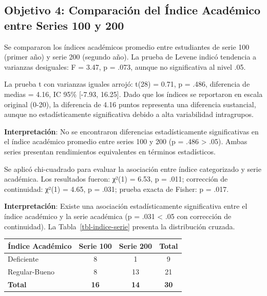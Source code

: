 \documentclass[
  stu,
  floatsintext,
  longtable,
  a4paper,
  nolmodern,
  notxfonts,
  notimes,
  12pt,
  colorlinks=true,linkcolor=blue,citecolor=blue,urlcolor=blue]{apa7}
\newcounter{none} %
\begin{document}
\subsection{Objetivo 4: Comparación del Índice Académico entre Series
100 y
200}\label{objetivo-4-comparaciuxf3n-del-uxedndice-acaduxe9mico-entre-series-100-y-200}

Se compararon los índices académicos promedio entre estudiantes de serie
100 (primer año) y serie 200 (segundo año). La prueba de Levene indicó
tendencia a varianzas desiguales: F = 3.47, p = .073, aunque no
significativa al nivel .05.

La prueba t con varianzas iguales arrojó: t(28) = 0.71, p = .486,
diferencia de medias = 4.16, IC 95\% {[}-7.93, 16.25{]}. Dado que los
índices se reportaron en escala original (0-20), la diferencia de 4.16
puntos representa una diferencia sustancial, aunque no estadísticamente
significativa debido a alta variabilidad intragrupos.

\textbf{Interpretación}: No se encontraron diferencias estadísticamente
significativas en el índice académico promedio entre series 100 y 200 (p
= .486 \textgreater{} .05). Ambas series presentan rendimientos
equivalentes en términos estadísticos.

Se aplicó chi-cuadrado para evaluar la asociación entre índice
categorizado y serie académica. Los resultados fueron: χ²(1) = 6.53, p =
.011; corrección de continuidad: χ²(1) = 4.65, p = .031; prueba exacta
de Fisher: p = .017.

\textbf{Interpretación}: Existe una asociación estadísticamente
significativa entre el índice académico y la serie académica (p = .031
\textless{} .05 con corrección de continuidad). La
Tabla~\ref{tbl-indice-serie} presenta la distribución cruzada.

\begin{table}

{\caption{{Tabla Cruzada Índice Académico y Serie
Académica}{\label{tbl-indice-serie}}}}

{\def\LTcaptype{none} %
\begin{longtable}[]{@{}lccc@{}}
\toprule\noalign{}
Índice Académico & Serie 100 & Serie 200 & Total \\
\midrule\noalign{}
\endhead
\bottomrule\noalign{}
\endlastfoot
Deficiente & 8 & 1 & 9 \\
Regular-Bueno & 8 & 13 & 21 \\
\textbf{Total} & \textbf{16} & \textbf{14} & \textbf{30} \\
\end{longtable}
}

\end{table}
\end{document}
